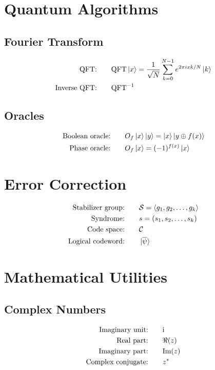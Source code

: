 \documentclass[12pt]{article}
\newcommand{\QFT}{\text{QFT}}
\newcommand{\iQFT}{\text{QFT}^{-1}}
\newcommand{\oraclef}{O_f}
\newcommand{\stab}{\mathcal{S}}
\newcommand{\syndrome}{s}
\newcommand{\codespace}{\mathcal{C}}
\newcommand{\codeword}{\ket{\overline{\psi}}}
\newcommand{\ii}{\mathrm{i}}
\newcommand{\imag}{\text{Im}}
\newcommand{\conj}[1]{#1^*}
\theoremstyle{definition}
\theoremstyle{remark}
\begin{document}
\section{Quantum Algorithms}

\subsection{Fourier Transform}
\begin{alignat}{2}
\text{QFT:}         &\quad && \QFT\ket{x} = \frac{1}{\sqrt{N}} \sum_{k=0}^{N-1} e^{2\pi i xk/N}\ket{k} \\
\text{Inverse QFT:} &\quad && \iQFT
\end{alignat}

\subsection{Oracles}
\begin{alignat}{2}
\text{Boolean oracle:} &\quad && \oraclef\ket{x}\ket{y} = \ket{x}\ket{y \oplus f(x)} \\
\text{Phase oracle:}   &\quad && \oraclef\ket{x} = (-1)^{f(x)}\ket{x}
\end{alignat}

\section{Error Correction}

\begin{alignat}{2}
\text{Stabilizer group:}  &\quad && \stab = \langle g_1, g_2, \ldots, g_k \rangle \\
\text{Syndrome:}          &\quad && \syndrome = (s_1, s_2, \ldots, s_k) \\
\text{Code space:}        &\quad && \codespace \\
\text{Logical codeword:}  &\quad && \codeword
\end{alignat}


\section{Mathematical Utilities}

\subsection{Complex Numbers}
\begin{alignat}{2}
\text{Imaginary unit:}     &\quad && \ii \\
\text{Real part:}          &\quad && \real(z) \\
\text{Imaginary part:}     &\quad && \imag(z) \\
\text{Complex conjugate:}  &\quad && \conj{z}
\end{alignat}
\end{document}

